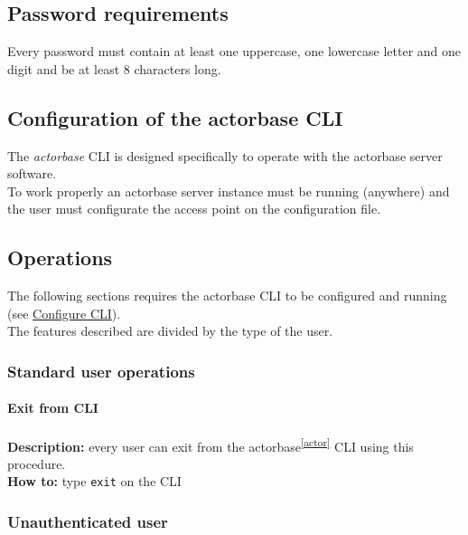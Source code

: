 \documentclass{scalatekids-article}
\begin{document}

\subsection{Password requirements}
\label{sec:passwordrequirement}
Every password must contain at least one uppercase, one lowercase letter and one
digit and be at least 8 characters long.

\subsection{Configuration of the actorbase CLI}
\label{sec:configurationcli}
The \textit{actorbase} CLI is designed specifically to operate
with the actorbase server software.\\
To work properly an actorbase server instance must be running
(anywhere) and the user must configurate the access point on the configuration file.

\subsection{Operations}

The following sections requires the actorbase CLI to be configured and
running (see \hyperref[sec:configurationcli]{Configure CLI}).\\
The features described are divided by the type of the user.

\subsubsection{Standard user operations}
\label{sec:everyuser}
\paragraph{Exit from CLI}

\textbf{Description:} every user can exit from the actorbase\textsuperscript{\ref{actor}} CLI
using this procedure.\\
\textbf{How to:} type \texttt{exit} on the CLI

\subsubsection{Unauthenticated user}
\label{sec:unauthenticateduser}
\end{document}
